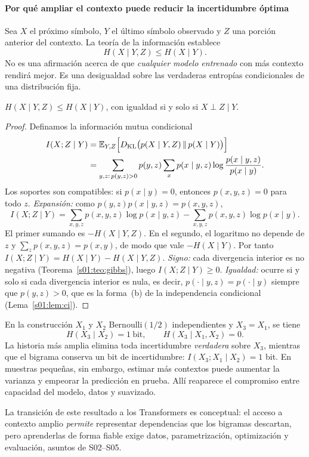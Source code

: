\paragraph{Por qué ampliar el contexto puede reducir la incertidumbre óptima}
Sea $X$ el próximo símbolo, $Y$ el último símbolo observado y $Z$
una porción anterior del contexto. La teoría de la información
establece
\[
H(X\mid Y,Z)\le H(X\mid Y).
\]
No es una afirmación acerca de que \emph{cualquier modelo entrenado}
con más contexto rendirá mejor. Es una desigualdad sobre las verdaderas
entropías condicionales de una distribución fija.
\begin{proposicion}\label{s01:prop:condicionar}
$H(X\mid Y,Z)\le H(X\mid Y)$, con igualdad si y solo si $X\perp Z\mid Y$.
\end{proposicion}
\begin{proof}
Definamos la información mutua condicional
\begin{align*}
I(X;Z\mid Y)
&=\mathbb E_{Y,Z}\Bigl[D_{\rm KL}\bigl(
 p(X\mid Y,Z)\,\|\,p(X\mid Y)
\bigr)\Bigr]\\
&=\sum_{y,z:\,p(y,z)>0}p(y,z)\sum_xp(x\mid y,z)\log\frac{p(x\mid y,z)}{p(x\mid y)}.
\end{align*}
Los soportes son compatibles: si $p(x\mid y)=0$, entonces $p(x,y,z)=0$ para todo
$z$. \emph{Expansión:} como $p(y,z)p(x\mid y,z)=p(x,y,z)$,
\[
I(X;Z\mid Y)=\sum_{x,y,z}p(x,y,z)\log p(x\mid y,z)-\sum_{x,y,z}p(x,y,z)\log p(x\mid y).
\]
El primer sumando es $-H(X\mid Y,Z)$. En el segundo, el logaritmo no depende de
$z$ y $\sum_zp(x,y,z)=p(x,y)$, de modo que vale $-H(X\mid Y)$. Por tanto
$I(X;Z\mid Y)=H(X\mid Y)-H(X\mid Y,Z)$.
\emph{Signo:} cada divergencia interior es no negativa (Teorema~\ref{s01:teo:gibbs}),
luego $I(X;Z\mid Y)\ge0$.
\emph{Igualdad:} ocurre si y solo si cada divergencia interior es nula, es decir,
$p(\cdot\mid y,z)=p(\cdot\mid y)$ siempre que $p(y,z)>0$, que es la forma~(b) de la
independencia condicional (Lema~\ref{s01:lem:ci}).
\end{proof}

\begin{ejemplo}
En la construcción $X_1$ y $X_2$ Bernoulli$(1/2)$ independientes y
$X_3=X_1$, se tiene
\[
H(X_3\mid X_2)=1\ \text{bit},
\qquad H(X_3\mid X_1,X_2)=0.
\]
La historia más amplia elimina toda incertidumbre \emph{verdadera}
sobre $X_3$, mientras que el bigrama conserva un bit de incertidumbre:
$I(X_3;X_1\mid X_2)=1$ bit.
En muestras pequeñas, sin embargo, estimar más contextos puede aumentar
la varianza y empeorar la predicción en prueba. Allí reaparece el
compromiso entre capacidad del modelo, datos y suavizado.
\end{ejemplo}
La transición de este resultado a los Transformers es conceptual:
el acceso a contexto amplio \emph{permite} representar dependencias
que los bigramas descartan, pero aprenderlas de forma fiable exige
datos, parametrización, optimización y evaluación, asuntos de S02--S05.

